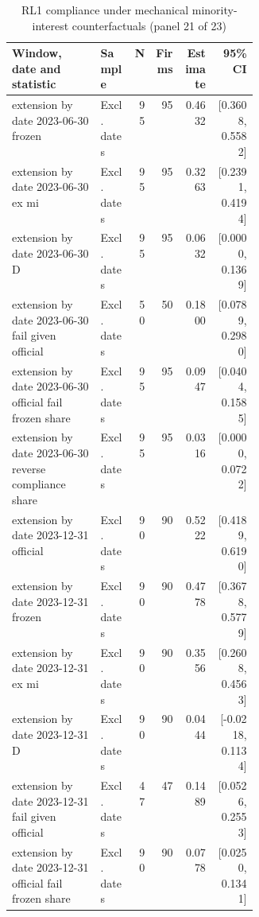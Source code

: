\begin{table}[!htbp]\centering\scriptsize
\caption{RL1 compliance under mechanical minority-interest counterfactuals (panel 21 of 23)}
\begin{threeparttable}
\begin{tabular}{p{0.36\linewidth}lrrrr}
\toprule
Window, date and statistic & Sample & N & Firms & Estimate & 95\% CI \\
\midrule
extension by date 2023-06-30 frozen & Excl. dates & 95 & 95 & 0.4632 & [0.3608, 0.5582] \\
extension by date 2023-06-30 ex mi & Excl. dates & 95 & 95 & 0.3263 & [0.2391, 0.4194] \\
extension by date 2023-06-30 D & Excl. dates & 95 & 95 & 0.0632 & [0.0000, 0.1369] \\
extension by date 2023-06-30 fail given official & Excl. dates & 50 & 50 & 0.1800 & [0.0789, 0.2980] \\
extension by date 2023-06-30 official fail frozen share & Excl. dates & 95 & 95 & 0.0947 & [0.0404, 0.1585] \\
extension by date 2023-06-30 reverse compliance share & Excl. dates & 95 & 95 & 0.0316 & [0.0000, 0.0722] \\
extension by date 2023-12-31 official & Excl. dates & 90 & 90 & 0.5222 & [0.4189, 0.6190] \\
extension by date 2023-12-31 frozen & Excl. dates & 90 & 90 & 0.4778 & [0.3678, 0.5779] \\
extension by date 2023-12-31 ex mi & Excl. dates & 90 & 90 & 0.3556 & [0.2608, 0.4563] \\
extension by date 2023-12-31 D & Excl. dates & 90 & 90 & 0.0444 & [-0.0218, 0.1134] \\
extension by date 2023-12-31 fail given official & Excl. dates & 47 & 47 & 0.1489 & [0.0526, 0.2553] \\
extension by date 2023-12-31 official fail frozen share & Excl. dates & 90 & 90 & 0.0778 & [0.0250, 0.1341] \\
\bottomrule
\end{tabular}
\begin{tablenotes}[flushleft]\footnotesize

\end{tablenotes}
\end{threeparttable}
\end{table}
